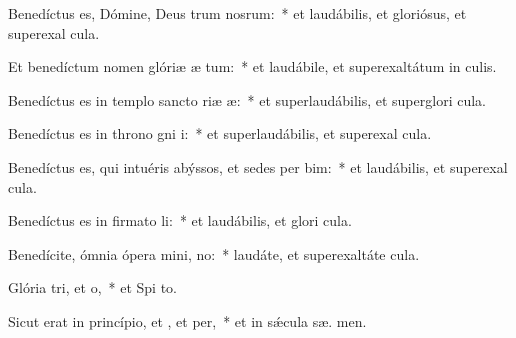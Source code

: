 \item Benedíctus es, Dómine, Deus trum nosrum:~* et laudábilis, et gloriósus, et superexal  cula.

\item Et benedíctum nomen glóriæ æ tum:~* et laudábile, et superexaltátum in  culis.

\item Benedíctus es in templo sancto riæ æ:~* et superlaudábilis, et superglori  cula.

\item Benedíctus es in throno gni i:~* et superlaudábilis, et superexal  cula.

\item Benedíctus es, qui intuéris abýssos, et sedes per bim:~* et laudábilis, et superexal  cula.

\item Benedíctus es in firmato li:~* et laudábilis, et glori  cula.

\item Benedícite, ómnia ópera mini, no:~* laudáte, et superexaltáte   cula.

\item Glória tri, et o,~* et Spi to.

\item Sicut erat in princípio, et , et per,~* et in sǽcula sæ. men.